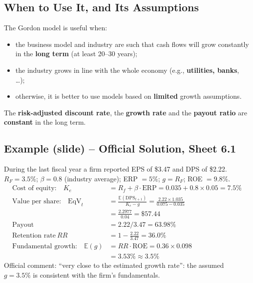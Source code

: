 \subsection{When to Use It, and Its Assumptions}
The Gordon model is useful when:
\begin{itemize}
  \item the business model and industry are such that cash flows will grow constantly in the \textbf{long term} (at least 20--30 years);
  \item the industry grows in line with the whole economy (e.g., \textbf{utilities, banks}, \dots);
  \item otherwise, it is better to use models based on \textbf{limited} growth assumptions.
\end{itemize}
\begin{keybox}
The \textbf{risk-adjusted discount rate}, the \textbf{growth rate} and the \textbf{payout ratio} are \textbf{constant} in the long term.
\end{keybox}

\subsection{Example (slide) -- Official Solution, Sheet 6.1}
\begin{exbox}
During the last fiscal year a firm reported EPS of \$3.47 and DPS of \$2.22. $R_F=3.5\%$; $\beta=0.8$ (industry average); ERP $=5\%$; $g=R_F$; ROE $=9.8\%$.
\begin{align*}
\text{Cost of equity:}\quad K_e&=R_f+\beta\cdot\text{ERP}=0.035+0.8\times0.05=\mathbf{7.5\%}\\
\text{Value per share:}\quad \text{EqV}_t&=\frac{\mathbb{E}(\text{DPS}_{t+1})}{K_e-g}=\frac{2.22\times1.035}{0.075-0.035}\\&=\frac{2.2977}{0.04}=\mathbf{\$57.44}\\
\text{Payout}&=2.22/3.47=63.98\%\\ \text{Retention rate}\ RR&=1-\frac{2.22}{3.47}=\mathbf{36.0\%}\\
\text{Fundamental growth:}\quad \mathbb{E}(g)&=RR\cdot\text{ROE}=0.36\times0.098\\&=\mathbf{3.53\%}\approx3.5\%
\end{align*}
Official comment: ``very close to the estimated growth rate'': the assumed $g=3.5\%$ is consistent with the firm's fundamentals.
\end{exbox}

